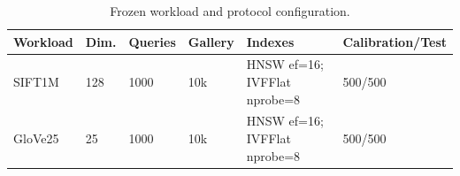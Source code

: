 \begin{table}[t]
\centering
\caption{Frozen workload and protocol configuration.}
\label{tab:protocol}
\begin{tabular}{llllll}
\hline
Workload & Dim. & Queries & Gallery & Indexes & Calibration/Test \\
\hline
SIFT1M & 128 & 1000 & 10k & HNSW ef=16; IVFFlat nprobe=8 & 500/500 \\
GloVe25 & 25 & 1000 & 10k & HNSW ef=16; IVFFlat nprobe=8 & 500/500 \\
\hline
\end{tabular}
\end{table}
